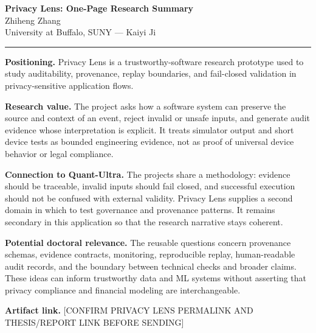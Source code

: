\documentclass[11pt]{article}
\newcommand{\ApplicantName}{Zhiheng Zhang}
\begin{document}
\begin{center}
{\LARGE\bfseries Privacy Lens: One-Page Research Summary}\\[0.25em]
{\large \ApplicantName}\\
University at Buffalo, SUNY --- Kaiyi Ji
\end{center}
\vspace{0.35em}\hrule\vspace{0.65em}

\textbf{Positioning.} Privacy Lens is a trustworthy-software research prototype used to study auditability, provenance, replay boundaries, and fail-closed validation in privacy-sensitive application flows.

\textbf{Research value.} The project asks how a software system can preserve the source and context of an event, reject invalid or unsafe inputs, and generate audit evidence whose interpretation is explicit. It treats simulator output and short device tests as bounded engineering evidence, not as proof of universal device behavior or legal compliance.

\textbf{Connection to Quant-Ultra.} The projects share a methodology: evidence should be traceable, invalid inputs should fail closed, and successful execution should not be confused with external validity. Privacy Lens supplies a second domain in which to test governance and provenance patterns. It remains secondary in this application so that the research narrative stays coherent.

\textbf{Potential doctoral relevance.} The reusable questions concern provenance schemas, evidence contracts, monitoring, reproducible replay, human-readable audit records, and the boundary between technical checks and broader claims. These ideas can inform trustworthy data and ML systems without asserting that privacy compliance and financial modeling are interchangeable.

\textbf{Artifact link.} [CONFIRM PRIVACY LENS PERMALINK AND THESIS/REPORT LINK BEFORE SENDING]
\end{document}

